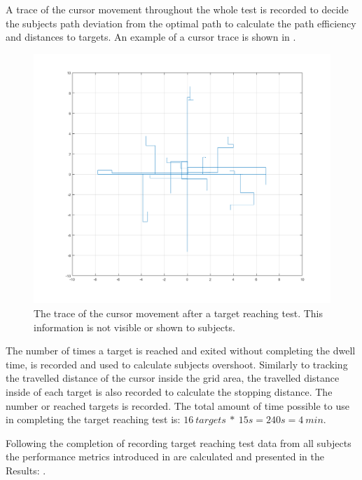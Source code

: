 A trace of the cursor movement throughout the whole test is recorded to decide the subjects path deviation from the optimal path to calculate the path efficiency and distances to targets. An example of a cursor trace is shown in . 

\begin{figure}[H] 
	\includegraphics[width=1\textwidth]{figures/pMethods/trajectory}
	\caption{The trace of the cursor movement after a target reaching test. This information is not visible or shown to subjects.}
	\label{fig:cursorTrace}
\end{figure}
The number of times a target is reached and exited without completing the dwell time, is recorded and used to calculate subjects overshoot. Similarly to tracking the travelled distance of the cursor inside the grid area, the travelled distance inside of each target is also recorded to calculate the stopping distance. The number or reached targets is recorded. The total amount of time possible to use in completing the target reaching test is: $16 ~targets~*~15s = 240s = 4~min$. 

Following the completion of recording target reaching test data from all subjects the performance metrics introduced in  are calculated and presented in the Results: .




